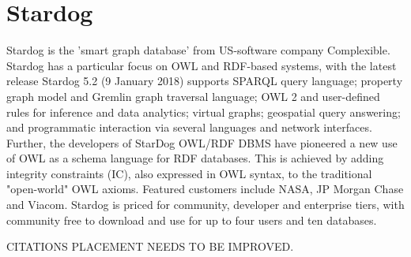 \section{Stardog}
Stardog is the 'smart graph database' from US-software company Complexible.
Stardog has a particular focus on OWL and RDF-based systems, with the latest
release Stardog 5.2 (9 January 2018) supports SPARQL query language; property
graph model and Gremlin graph traversal language; OWL 2 and user-defined rules
for inference and data analytics; virtual graphs; geospatial query answering;
and programmatic interaction via several languages and network interfaces.
\cite{stardog-docs} Further, the developers of StarDog OWL/RDF DBMS have
pioneered a new use of OWL as a schema language for RDF databases. This is
achieved by adding integrity constraints (IC), also expressed in OWL syntax,
to the traditional "open-world" OWL axioms.\cite{stardog-schema} Featured
customers include NASA, JP Morgan Chase and Viacom. Stardog is priced for
community, developer and enterprise tiers, with community free to download
and use for up to four users and ten databases.\cite{stardog-computerword}
 
 
CITATIONS PLACEMENT NEEDS TO BE IMPROVED.

